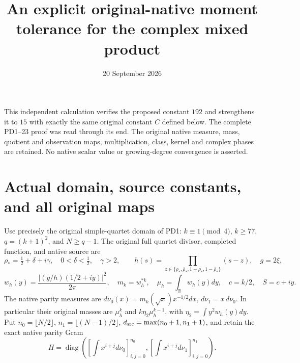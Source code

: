 \documentclass[11pt]{article}
\title{An explicit original-native moment tolerance for the complex mixed product}
\author{}
\date{20 September 2026}
\newcommand{\diag}{\operatorname{diag}}
\begin{document}
\maketitle

This independent calculation verifies the proposed constant $192$
and strengthens it to $15$ with exactly the same original constant
$C$ defined below. The complete PD1--23 proof \cite{PD} was read
through its end. The original native measure, mass, quotient and
observation maps, multiplication, class, kernel and complex phases
are retained. No native scalar value or growing-degree convergence
is asserted.

\section{Actual domain, source constants, and all original maps}

Use precisely the original simple-quartet domain of PD1:
$k\equiv1\pmod4$, $k\ge77$, $q=(k+1)^2$, and $N\ge q-1$.
The original full quartet divisor, completed function, and native
source are
\[
 \rho_*=\tfrac12+\delta+i\gamma,\quad0<\delta<\tfrac12,\quad\gamma>2,
 \qquad
 h(s)=\prod_{z\in\{\rho_*,\bar\rho_*,1-\rho_*,1-\bar\rho_*\}}(s-z),
 \quad g=2\xi,
\]
\[
 w_h(y)=\frac{|(g/h)(1/2+iy)|^2}{2\pi},\quad m_k=w_h^{*k},
 \quad \mu_h=\int_{\mathbb R}w_h(y)dy,\quad c=k/2,\quad S=c+iy.
\]
The native parity measures are
$d\nu_0(x)=m_k(\sqrt x)x^{-1/2}dx$, $d\nu_1=x\,d\nu_0$.
In particular their original masses are $\mu_h^k$ and
$k\eta_2\mu_h^{k-1}$, with $\eta_2=\int y^2w_h(y)dy$.
Put $n_0=\lfloor N/2\rfloor$, $n_1=\lfloor(N-1)/2\rfloor$,
$d_{\rm src}=\max(n_0+1,n_1+1)$, and retain the exact native
parity Gram
\begin{equation}\tag{MC1}\label{eq:H}
 H=\diag\left([\int x^{i+j}d\nu_0]_{i,j=0}^{n_0},
               [\int x^{i+j}d\nu_1]_{i,j=0}^{n_1}\right).
\end{equation}
\end{document}
